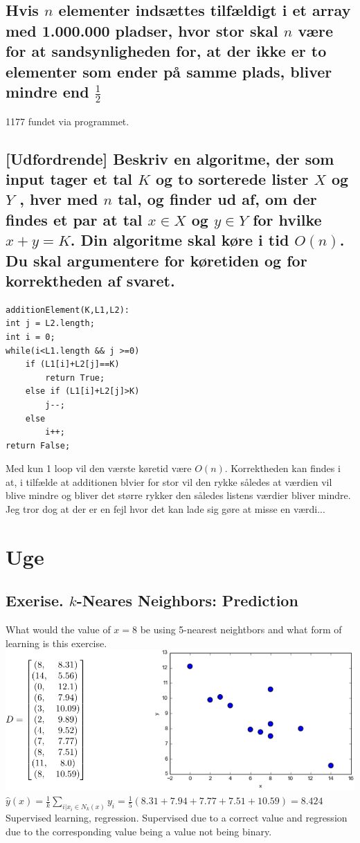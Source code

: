 \documentclass[12pt, a4paper]{article}
\begin{document}
		\subsection{Hvis $n$ elementer indsættes tilfældigt i et array med 1.000.000 pladser, hvor stor skal $n$ være for at sandsynligheden for, at der ikke er to elementer som ender på samme plads, bliver mindre end $\frac{1}{2}$}
			1177 fundet via programmet.
		\subsection{[Udfordrende] Beskriv en algoritme, der som input tager et tal $K$ og to sorterede lister $X$ og $Y$ , hver med $n$ tal, og finder ud af, om der findes et par at tal $x \in X$ og $y \in Y$ for hvilke $x + y = K$. Din algoritme skal køre i tid $O(n)$. Du skal argumentere for køretiden og for korrektheden af svaret.}
			\begin{lstlisting}
additionElement(K,L1,L2):
int j = L2.length;
int i = 0;
while(i<L1.length && j >=0)
	if (L1[i]+L2[j]==K)
		return True;
	else if (L1[i]+L2[j]>K)
		j--;
	else
		i++;
return False;
			\end{lstlisting}
			Med kun 1 loop vil den værste køretid være $O(n)$. Korrektheden kan findes i at, i tilfælde at additionen blvier for stor vil den rykke således at værdien vil blive mindre og bliver det større rykker den således listens værdier bliver mindre. Jeg tror dog at der er en fejl hvor det kan lade sig gøre at misse en værdi...
	\section{Uge}
		\subsection{Exerise. $k$-Neares Neighbors: Prediction}
			What would the value of $x=8$ be using 5-nearest neightbors and what form of learning is this exercise.\\
			\includegraphics[width=\linewidth]{images/41,1.png}\\
			$\hat{y}(x)=\frac{1}{k}\sum\limits_{i|x_i\in N_k(x)}y_i=\frac{1}{5}(8.31+7.94+7.77+7.51+10.59)=8.424$\\
			Supervised learning, regression. Supervised due to a correct value and regression due to the  corresponding value being a value not being binary.
\end{document}
